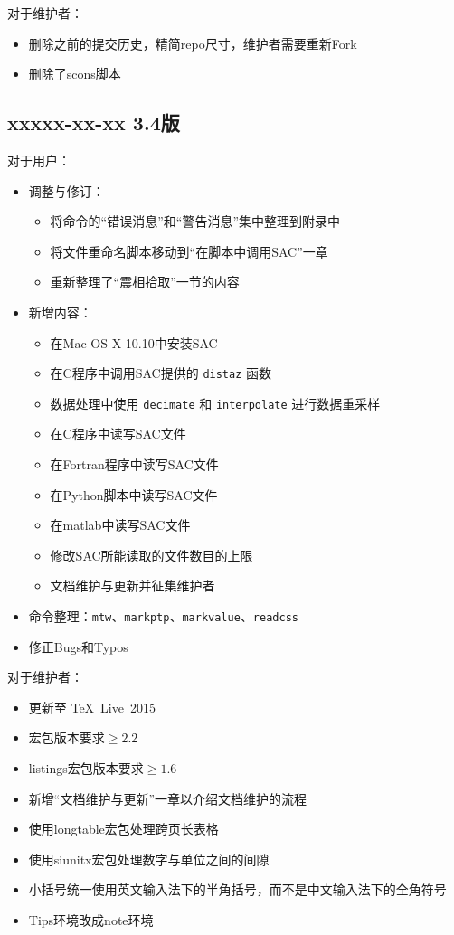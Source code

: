 对于维护者：
\begin{itemize}
\item 删除之前的提交历史，精简repo尺寸，维护者需要重新Fork
\item 删除了scons脚本
\end{itemize}

\subsection*{xxxxx-xx-xx 3.4版}
对于用户：
\begin{itemize}
\item 调整与修订：
    \begin{itemize}
    \item 将命令的``错误消息''和``警告消息''集中整理到附录中
    \item 将文件重命名脚本移动到``在脚本中调用SAC''一章
    \item 重新整理了``震相拾取''一节的内容
    \end{itemize}
\item 新增内容：
    \begin{itemize}
    \item 在Mac OS X 10.10中安装SAC
    \item 在C程序中调用SAC提供的 \texttt{distaz} 函数
    \item 数据处理中使用 \texttt{decimate} 和 \texttt{interpolate} 进行数据重采样
    \item 在C程序中读写SAC文件
    \item 在Fortran程序中读写SAC文件
    \item 在Python脚本中读写SAC文件
    \item 在matlab中读写SAC文件
    \item 修改SAC所能读取的文件数目的上限
    \item 文档维护与更新并征集维护者
    \end{itemize}
\item 命令整理：\texttt{mtw}、\texttt{markptp}、\texttt{markvalue}、\texttt{readcss}
\item 修正Bugs和Typos
\end{itemize}

对于维护者：
\begin{itemize}
\item 更新至 \TeX~Live~2015
\item \CTeX 宏包版本要求$\geq 2.2$
\item listings宏包版本要求$\geq 1.6$
\item 新增``文档维护与更新''一章以介绍文档维护的流程
\item 使用longtable宏包处理跨页长表格
\item 使用siunitx宏包处理数字与单位之间的间隙
\item 小括号统一使用英文输入法下的半角括号，而不是中文输入法下的全角符号
\item Tips环境改成note环境
\end{itemize}
